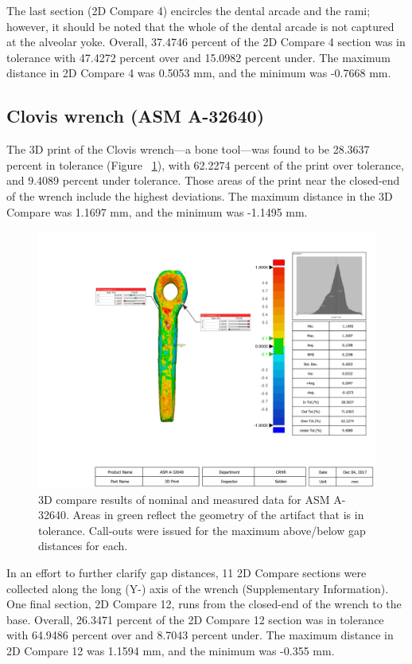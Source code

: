 \documentclass[review]{elsarticle}
\begin{document}
The last section (2D Compare 4) encircles the dental arcade and the rami; however, it should be noted that the whole of the dental arcade is not captured at the alveolar yoke. Overall, 37.4746 percent of the 2D Compare 4 section was in tolerance with 47.4272 percent over and 15.0982 percent under. The maximum distance in 2D Compare 4 was 0.5053 mm, and the minimum was -0.7668 mm.

\subsection*{Clovis wrench (ASM A-32640)}

The 3D print of the Clovis wrench---a bone tool---was found to be 28.3637 percent in tolerance (Figure ~\ref{fig:FigWrench}), with 62.2274 percent of the print over tolerance, and 9.4089 percent under tolerance. Those areas of the print near the closed-end of the wrench include the highest deviations. The maximum distance in the 3D Compare was 1.1697 mm, and the minimum was -1.1495 mm.

\begin{figure}[ht]\centering
\includegraphics[width=\linewidth]{FigWrench}
\caption{3D compare results of nominal and measured data for ASM A-32640. Areas in green reflect the geometry of the artifact that is in tolerance. Call-outs were issued for the maximum above/below gap distances for each.}
\label{fig:FigWrench}
\end{figure}

In an effort to further clarify gap distances, 11 2D Compare sections were collected along the long (Y-) axis of the wrench (Supplementary Information). One final section, 2D Compare 12, runs from the closed-end of the wrench to the base. Overall, 26.3471 percent of the 2D Compare 12 section was in tolerance with 64.9486 percent over and 8.7043 percent under. The maximum distance in 2D Compare 12 was 1.1594 mm, and the minimum was -0.355 mm.
\end{document}
